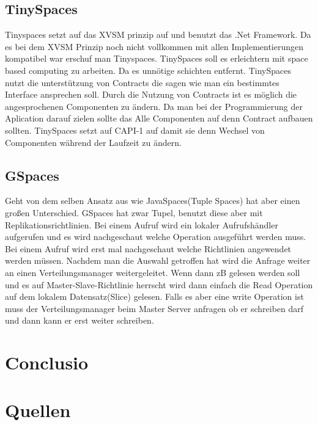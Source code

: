 \documentclass[a4paper,12pt]{scrreprt}
\begin{document}
		
		\section{TinySpaces}
			Tinyspaces setzt auf das XVSM prinzip auf und benutzt das .Net Framework. Da es bei dem XVSM Prinzip noch nicht vollkommen mit allen Implementierungen kompatibel war erschuf man Tinyspaces. 
			TinySpaces soll es erleichtern mit space based computing zu arbeiten. Da es unnötige schichten entfernt. 
			TinySpaces nutzt die unterstützung von Contracts die sagen wie man ein bestimmtes Interface ansprechen soll.
			Durch die Nutzung von Contracts ist es möglich die angesprochenen Componenten zu ändern. Da man bei der Programmierung der Aplication darauf zielen sollte das Alle Componenten auf denn Contract aufbauen sollten.
			TinySpaces setzt auf CAPI-1 auf damit sie denn Wechsel von Componenten während der Laufzeit zu ändern.
		\section{GSpaces}
		Geht von dem selben Ansatz aus wie JavaSpaces(Tuple Spaces) hat aber einen großen Unterschied. GSpaces hat zwar Tupel, benutzt diese aber mit Replikationsrichtlinien.  Bei einem Aufruf wird ein lokaler Aufrufshändler aufgerufen und es wird nachgeschaut welche Operation ausgeführt werden muss. Bei  einem Aufruf wird erst mal nachgeschaut welche Richtlinien angewendet werden müssen. Nachdem man die Auswahl getroffen hat wird die Anfrage weiter an einen Verteilungsmanager weitergeleitet.  Wenn dann zB gelesen werden soll und es auf Master-Slave-Richtlinie herrscht wird dann einfach die Read Operation auf dem lokalem Datensatz(Slice) gelesen. Falls es aber eine write Operation ist muss der Verteilungsmanager beim Master Server anfragen ob er schreiben darf und dann kann er erst weiter schreiben.	
	
\chapter{Conclusio}

\chapter{Quellen}
\end{document}
